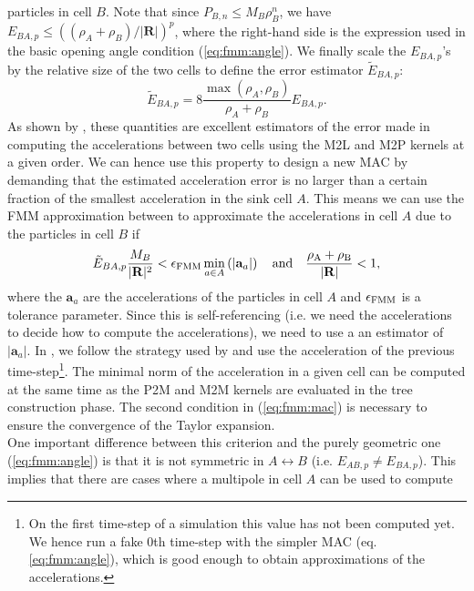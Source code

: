 particles in cell $B$. Note that since $P_{B,n} \leq M_B
\rho_B^n$, we have $E_{BA, p} \leq \left((\rho_A +
\rho_B)/|\mathbf{R}|\right)^p$, where the right-hand side is the
expression used in the basic opening angle condition
(\ref{eq:fmm:angle}). We finally scale the $E_{BA,p}$'s by the relative
size of the two cells to define the error estimator $\tilde{E}_{BA,p}$:
\begin{equation}
  \tilde{E}_{BA,p} = 8\frac{\max(\rho_A, \rho_B)}{\rho_A + \rho_B}E_{BA,p}.
  \label{eq:fmm:e_ab_tilde}
\end{equation}
As shown by \cite{Dehnen2014}, these quantities are excellent estimators of
the error made in computing the accelerations between two cells using the
M2L and M2P kernels at a given order. We can hence use this property to
design a new MAC by demanding that the estimated acceleration error is no
larger than a certain fraction of the smallest acceleration in the sink
cell $A$. This means we can use the FMM approximation between to
approximate the accelerations in cell $A$ due to the particles in cell $B$ if
\begin{equation}
  \tilde{E}_{BA,p} \frac{M_B}{|\mathbf{R}|^2} < \epsilon_{\rm FMM} \min_{a\in
    A}\left(|\mathbf{a}_a|\right) \quad \rm{and} \quad \frac{\rho_A +
    \rho_B} {|\mathbf{R}|} < 1,
  \label{eq:fmm:mac}  
\end{equation}
where the $\mathbf{a}_a$ are the accelerations of the particles in cell $A$
and $\epsilon_{\rm FMM}$ is a tolerance parameter. Since this is self-referencing
(i.e. we need the accelerations to decide how to compute the
accelerations), we need to use a an estimator of $|\mathbf{a}_a|$. In
\swift, we follow the strategy used by \gadget and use the acceleration of
the previous time-step\footnote{On the first time-step of a simulation this
  value has not been computed yet. We hence run a fake 0th time-step with
  the simpler MAC (eq. \ref{eq:fmm:angle}), which is good enough to obtain
  approximations of the accelerations.}. The minimal norm of the
acceleration in a given cell can be computed at the same time as the P2M
and M2M kernels are evaluated in the tree construction phase. The second
condition in (\ref{eq:fmm:mac}) is necessary to ensure the convergence of the
Taylor expansion.\\
One important difference between this criterion and the purely
geometric one (\ref{eq:fmm:angle}) is that it is not symmetric in $A
\leftrightarrow B$ (i.e. $E_{AB,p} \neq E_{BA,p}$). This implies that
there are cases where a multipole in cell $A$ can be used to compute
